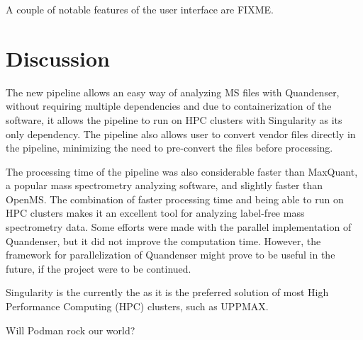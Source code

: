 \documentclass[11pt]{article}
\begin{document}
A couple of notable features of the user interface are FIXME.


\section*{Discussion}

The new pipeline allows an easy way of analyzing MS files with Quandenser, without requiring multiple dependencies and due to containerization of the software, it allows the pipeline to run on HPC clusters with Singularity as its only dependency. The pipeline also allows user to convert vendor files directly in the pipeline, minimizing the need to pre-convert the files before processing.

The processing time of the pipeline was also considerable faster than MaxQuant, a popular mass spectrometry analyzing software, and slightly faster than OpenMS. The combination of faster processing time and being able to run on HPC clusters makes it an excellent tool for analyzing label-free mass spectrometry data. Some efforts were made with the parallel implementation of Quandenser, but it did not improve the computation time. However, the framework for parallelization of Quandenser might prove to be useful in the future, if the project were to be continued.

Singularity is the currently the  as it is the preferred solution of most High Performance Computing (HPC) clusters, such as UPPMAX.

Will Podman rock our world?




\end{document}
